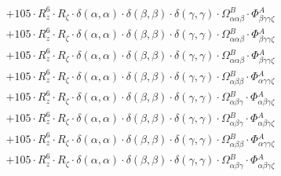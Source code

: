\documentclass{article}
\begin{document}
\begin{subequations}
\begin{gather}
\begin{array}{c}
 \\[0.2em] 		 + 105 \cdot R_{z}^{6} \cdot R_{\zeta{}} \cdot \delta{}\left(\alpha{}, \alpha{}\right) \cdot \delta{}\left(\beta{}, \beta{}\right) \cdot \delta{}\left(\gamma{}, \gamma{}\right) \cdot \Omega{}^{B}_{\alpha{}\alpha{}\beta{}} \cdot \Phi{}^{A}_{\beta{}\gamma{}\gamma{}\zeta{}} 
 \\[0.2em] 		 + 105 \cdot R_{z}^{6} \cdot R_{\zeta{}} \cdot \delta{}\left(\alpha{}, \alpha{}\right) \cdot \delta{}\left(\beta{}, \beta{}\right) \cdot \delta{}\left(\gamma{}, \gamma{}\right) \cdot \Omega{}^{B}_{\alpha{}\alpha{}\beta{}} \cdot \Phi{}^{A}_{\beta{}\gamma{}\gamma{}\zeta{}} 
 \\[0.2em] 		 + 105 \cdot R_{z}^{6} \cdot R_{\zeta{}} \cdot \delta{}\left(\alpha{}, \alpha{}\right) \cdot \delta{}\left(\beta{}, \beta{}\right) \cdot \delta{}\left(\gamma{}, \gamma{}\right) \cdot \Omega{}^{B}_{\alpha{}\alpha{}\beta{}} \cdot \Phi{}^{A}_{\beta{}\gamma{}\gamma{}\zeta{}} 
 \\[0.2em] 		 + 105 \cdot R_{z}^{6} \cdot R_{\zeta{}} \cdot \delta{}\left(\alpha{}, \alpha{}\right) \cdot \delta{}\left(\beta{}, \beta{}\right) \cdot \delta{}\left(\gamma{}, \gamma{}\right) \cdot \Omega{}^{B}_{\alpha{}\beta{}\beta{}} \cdot \Phi{}^{A}_{\alpha{}\gamma{}\gamma{}\zeta{}} 
 \\[0.2em] 		 + 105 \cdot R_{z}^{6} \cdot R_{\zeta{}} \cdot \delta{}\left(\alpha{}, \alpha{}\right) \cdot \delta{}\left(\beta{}, \beta{}\right) \cdot \delta{}\left(\gamma{}, \gamma{}\right) \cdot \Omega{}^{B}_{\alpha{}\beta{}\gamma{}} \cdot \Phi{}^{A}_{\alpha{}\beta{}\gamma{}\zeta{}} 
 \\[0.2em] 		 + 105 \cdot R_{z}^{6} \cdot R_{\zeta{}} \cdot \delta{}\left(\alpha{}, \alpha{}\right) \cdot \delta{}\left(\beta{}, \beta{}\right) \cdot \delta{}\left(\gamma{}, \gamma{}\right) \cdot \Omega{}^{B}_{\alpha{}\beta{}\gamma{}} \cdot \Phi{}^{A}_{\alpha{}\beta{}\gamma{}\zeta{}} 
 \\[0.2em] 		 + 105 \cdot R_{z}^{6} \cdot R_{\zeta{}} \cdot \delta{}\left(\alpha{}, \alpha{}\right) \cdot \delta{}\left(\beta{}, \beta{}\right) \cdot \delta{}\left(\gamma{}, \gamma{}\right) \cdot \Omega{}^{B}_{\alpha{}\beta{}\beta{}} \cdot \Phi{}^{A}_{\alpha{}\gamma{}\gamma{}\zeta{}} 
 \\[0.2em] 		 + 105 \cdot R_{z}^{6} \cdot R_{\zeta{}} \cdot \delta{}\left(\alpha{}, \alpha{}\right) \cdot \delta{}\left(\beta{}, \beta{}\right) \cdot \delta{}\left(\gamma{}, \gamma{}\right) \cdot \Omega{}^{B}_{\alpha{}\beta{}\gamma{}} \cdot \Phi{}^{A}_{\alpha{}\beta{}\gamma{}\zeta{}} 

\end{array}
\end{gather}
\end{subequations}
\end{document}
